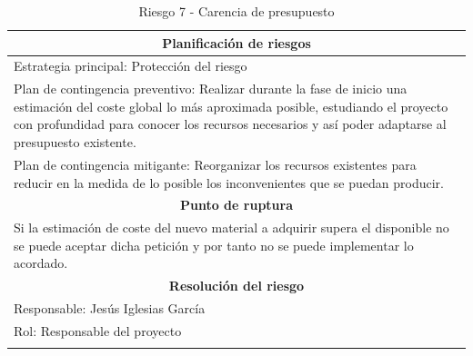 \documentclass[12pt,a4paper, twoside]{report}
\begin{document}
\begin{longtable}{m{4cm}|m{5cm}|m{4cm}}
		\multicolumn{3}{|c|}{\textbf{Planificación de riesgos}} \\ \hline \hline
		\multicolumn{3}{|p{17cm}|}{Estrategia principal: Protección del riesgo} \\ \hline			
		\multicolumn{3}{|p{17cm}|}{Plan de contingencia preventivo: Realizar durante la fase de inicio una estimación del coste global lo más aproximada posible, estudiando el proyecto con profundidad para conocer los recursos necesarios y así poder adaptarse al presupuesto existente.} \\ \hline
		\multicolumn{3}{|p{17cm}|}{Plan de contingencia mitigante: Reorganizar los recursos existentes para reducir en la medida de lo posible los inconvenientes que se puedan producir.} \\ \hline
			
		\multicolumn{3}{|c|}{\textbf{Punto de ruptura}} \\ \hline \hline
		\multicolumn{3}{|p{17cm}|}{Si la estimación de coste del nuevo material a adquirir supera el disponible no se puede aceptar dicha petición y por tanto no se puede implementar lo acordado.}\\ \hline
			
		\multicolumn{3}{|c|}{\textbf{Resolución del riesgo}} \\ \hline \hline
		\multicolumn{3}{|p{17cm}|}{Responsable: Jesús Iglesias García}\\ \hline
		\multicolumn{3}{|p{17cm}|}{Rol: Responsable del proyecto} \\ \hline
		\caption{Riesgo 7 - Carencia de presupuesto}			
	\end{longtable}
	
	\hspace{1cm}
	
\end{document}
